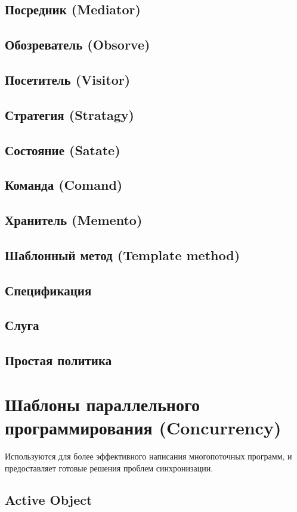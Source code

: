 \subsection{Посредник (Mediator)}
\subsection{Обозреватель (Obsorve)}
\subsection{Посетитель (Visitor)}
\subsection{Стратегия (Stratagy)}
\subsection{Состояние (Satate)}
\subsection{Команда (Comand)}
\subsection{Хранитель (Memento)}
\subsection{Шаблонный метод (Template method)}
\subsection{Спецификация}
\subsection{Слуга}
\subsection{Простая политика}

\section{Шаблоны параллельного программирования (Concurrency)}

Используются для более эффективного написания многопоточных программ, и предоставляет готовые решения проблем синхронизации. 

\subsection{Active Object}
